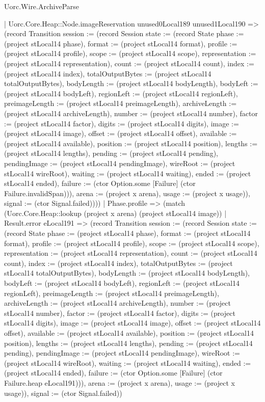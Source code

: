 \begin{lexlean}{Uorc.Wire.ArchiveParse}
\begin{semanticmodule}
{            | Uorc.Core.Heap::Node.imageReservation unused0Local189 unused1Local190 => (record Transition {session := (record Session {state := (record State {phase := (project stLocal14 phase), format := (project stLocal14 format), profile := (project stLocal14 profile), scope := (project stLocal14 scope), representation := (project stLocal14 representation), count := (project stLocal14 count), index := (project stLocal14 index), totalOutputBytes := (project stLocal14 totalOutputBytes), bodyLength := (project stLocal14 bodyLength), bodyLeft := (project stLocal14 bodyLeft), regionLeft := (project stLocal14 regionLeft), preimageLength := (project stLocal14 preimageLength), archiveLength := (project stLocal14 archiveLength), number := (project stLocal14 number), factor := (project stLocal14 factor), digits := (project stLocal14 digits), image := (project stLocal14 image), offset := (project stLocal14 offset), available := (project stLocal14 available), position := (project stLocal14 position), lengths := (project stLocal14 lengths), pending := (project stLocal14 pending), pendingImage := (project stLocal14 pendingImage), wireRoot := (project stLocal14 wireRoot), waiting := (project stLocal14 waiting), ended := (project stLocal14 ended), failure := (ctor Option.some [Failure] (ctor Failure.invalidSpan))}), arena := (project x arena), usage := (project x usage)}), signal := (ctor Signal.failed)})))
        | Phase.profile => (match (Uorc.Core.Heap::lookup (project x arena) (project stLocal14 image))
          | Result.error eLocal191 => (record Transition {session := (record Session {state := (record State {phase := (project stLocal14 phase), format := (project stLocal14 format), profile := (project stLocal14 profile), scope := (project stLocal14 scope), representation := (project stLocal14 representation), count := (project stLocal14 count), index := (project stLocal14 index), totalOutputBytes := (project stLocal14 totalOutputBytes), bodyLength := (project stLocal14 bodyLength), bodyLeft := (project stLocal14 bodyLeft), regionLeft := (project stLocal14 regionLeft), preimageLength := (project stLocal14 preimageLength), archiveLength := (project stLocal14 archiveLength), number := (project stLocal14 number), factor := (project stLocal14 factor), digits := (project stLocal14 digits), image := (project stLocal14 image), offset := (project stLocal14 offset), available := (project stLocal14 available), position := (project stLocal14 position), lengths := (project stLocal14 lengths), pending := (project stLocal14 pending), pendingImage := (project stLocal14 pendingImage), wireRoot := (project stLocal14 wireRoot), waiting := (project stLocal14 waiting), ended := (project stLocal14 ended), failure := (ctor Option.some [Failure] (ctor Failure.heap eLocal191))}), arena := (project x arena), usage := (project x usage)}), signal := (ctor Signal.failed)})
}
\end{semanticmodule}
\end{lexlean}
